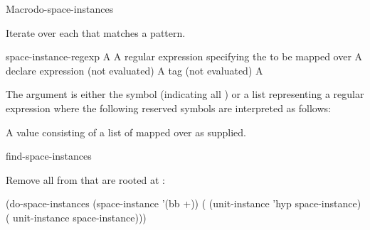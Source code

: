 \documentclass[10pt,twoside,english,pdftex]{article}
\begin{document}
\begin{functiondoc}{Macro}{do-space-instances}%
  {
    }

\fnsyntax

\fnpurpose Iterate over each  that matches a
 pattern.

\fnpackage {}

\fnmodule {}

\fnargs
\begin{args}{space-instance-regexp}
\arg[var] A 
 A  regular expression
specifying the  to be mapped over
\arg[declaration] A declare expression (not evaluated)
\arg[tag] A  tag (not evaluated)
\arg[form] A 
\end{args}

\fndescription 
The  argument is either the symbol
 (indicating all ) or a list
representing a regular expression where the following reserved symbols
are interpreted as follows:
\spaceinstanceregexp

A  value consisting of a list of
 mapped over as supplied.

\begin{alsos}{find-space-instances}
\end{alsos}

\fnexample 
{}%
%
Remove all   from
 that are rooted at :
%
\W\supp
\begin{example}
  (do-space-instances (space-instance '(bb +))
    ( (unit-instance 'hyp space-instance)
      ( unit-instance space-instance)))
\end{example}

\end{functiondoc}

\end{document}
